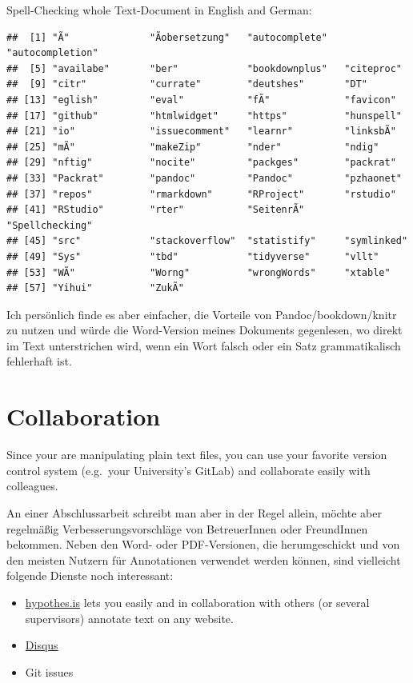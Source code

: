 \documentclass[]{book}
\providecommand{\tightlist}{%
  \setlength{\itemsep}{0pt}\setlength{\parskip}{0pt}}
\theoremstyle{definition}
\theoremstyle{definition}
\theoremstyle{remark}
\begin{document}
Spell-Checking whole Text-Document in English and German:

\begin{verbatim}
##  [1] "Ã"              "Ãobersetzung"   "autocomplete"   "autocompletion"
##  [5] "availabe"       "ber"            "bookdownplus"   "citeproc"      
##  [9] "citr"           "currate"        "deutshes"       "DT"            
## [13] "eglish"         "eval"           "fÃ"             "favicon"       
## [17] "github"         "htmlwidget"     "https"          "hunspell"      
## [21] "io"             "issuecomment"   "learnr"         "linksbÃ"       
## [25] "mÃ"             "makeZip"        "nder"           "ndig"          
## [29] "nftig"          "nocite"         "packges"        "packrat"       
## [33] "Packrat"        "pandoc"         "Pandoc"         "pzhaonet"      
## [37] "repos"          "rmarkdown"      "RProject"       "rstudio"       
## [41] "RStudio"        "rter"           "SeitenrÃ"       "Spellchecking" 
## [45] "src"            "stackoverflow"  "statistify"     "symlinked"     
## [49] "Sys"            "tbd"            "tidyverse"      "vllt"          
## [53] "WÃ"             "Worng"          "wrongWords"     "xtable"        
## [57] "Yihui"          "ZukÃ"
\end{verbatim}

Ich persönlich finde es aber einfacher, die Vorteile von
Pandoc/bookdown/knitr zu nutzen und würde die Word-Version meines
Dokuments gegenlesen, wo direkt im Text unterstrichen wird, wenn ein
Wort falsch oder ein Satz grammatikalisch fehlerhaft ist.

\section{Collaboration}\label{collaboration}

Since your are manipulating plain text files, you can use your favorite
version control system (e.g.~your University's GitLab) and collaborate
easily with colleagues.

An einer Abschlussarbeit schreibt man aber in der Regel allein, möchte
aber regelmäßig Verbesserungsvorschläge von BetreuerInnen oder
FreundInnen bekommen. Neben den Word- oder PDF-Versionen, die
herumgeschickt und von den meisten Nutzern für Annotationen verwendet
werden können, sind vielleicht folgende Dienste noch interessant:

\begin{itemize}
\tightlist
\item
  \href{https://web.hypothes.is/}{hypothes.is} lets you easily and in
  collaboration with others (or several supervisors) annotate text on
  any website.
\item
  \href{https://disqus.com/}{Disqus}
\item
  Git issues
\end{itemize}
\end{document}
